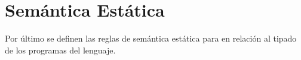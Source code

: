 \documentclass[12pt]{extarticle}
\begin{document}
\section{Semántica Estática}

Por último se definen las reglas de semántica estática para \tinyc en relación al tipado de los programas del lenguaje.
\end{document}
